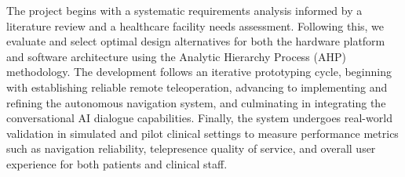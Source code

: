 The project begins with a systematic requirements analysis informed by a literature review and a healthcare facility needs assessment. Following this, we evaluate and select optimal design alternatives for both the hardware platform and software architecture using the Analytic Hierarchy Process (AHP) methodology. The development follows an iterative prototyping cycle, beginning with establishing reliable remote teleoperation, advancing to implementing and refining the autonomous navigation system, and culminating in integrating the conversational AI dialogue capabilities. Finally, the system undergoes real-world validation in simulated and pilot clinical settings to measure performance metrics such as navigation reliability, telepresence quality of service, and overall user experience for both patients and clinical staff.
